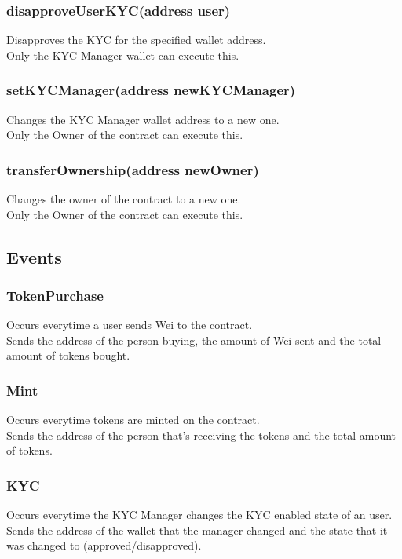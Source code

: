 \documentclass[11pt]{article} %
\begin{document}
\subsubsection{disapproveUserKYC(address user)}
Disapproves the KYC for the specified wallet address.\\
Only the KYC Manager wallet can execute this.

\subsubsection{setKYCManager(address newKYCManager)}
Changes the KYC Manager wallet address to a new one.\\
Only the Owner of the contract can execute this.

\subsubsection{transferOwnership(address newOwner)}
Changes the owner of the contract to a new one.\\
Only the Owner of the contract can execute this.

\subsection{Events}

\subsubsection{TokenPurchase}
Occurs everytime a user sends Wei to the contract.\\
Sends the address of the person buying, the amount of Wei sent and the total amount of tokens bought.

\subsubsection{Mint}
Occurs everytime tokens are minted on the contract.\\
Sends the address of the person that's receiving the tokens and the total amount of tokens.

\subsubsection{KYC}
Occurs everytime the KYC Manager changes the KYC enabled state of an user.\\
Sends the address of the wallet that the manager changed and the state that it was changed to (approved/disapproved).
\end{document}
